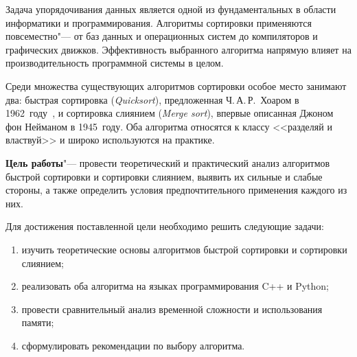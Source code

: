 Задача упорядочивания данных является одной из фундаментальных в области
информатики и программирования. Алгоритмы сортировки применяются повсеместно"---
от баз данных и операционных систем до компиляторов и графических движков.
Эффективность выбранного алгоритма напрямую влияет на производительность
программной системы в целом.

Среди множества существующих алгоритмов сортировки особое место занимают
два: быстрая сортировка (\textit{Quicksort}), предложенная Ч.\,А.\,Р.~Хоаром
в 1962~году~\cite{hoare1962}, и сортировка слиянием (\textit{Merge sort}),
впервые описанная Джоном фон Нейманом в 1945~году. Оба алгоритма относятся
к классу <<разделяй и властвуй>> и широко используются на практике.

\textbf{Цель работы}"--- провести теоретический и практический анализ
алгоритмов быстрой сортировки и сортировки слиянием, выявить их сильные
и слабые стороны, а также определить условия предпочтительного применения
каждого из них.

Для достижения поставленной цели необходимо решить следующие задачи:
\begin{enumerate}
    \item изучить теоретические основы алгоритмов быстрой сортировки
          и сортировки слиянием;
    \item реализовать оба алгоритма на языках программирования C++ и Python;
    \item провести сравнительный анализ временной сложности и использования
          памяти;
    \item сформулировать рекомендации по выбору алгоритма.
\end{enumerate}
